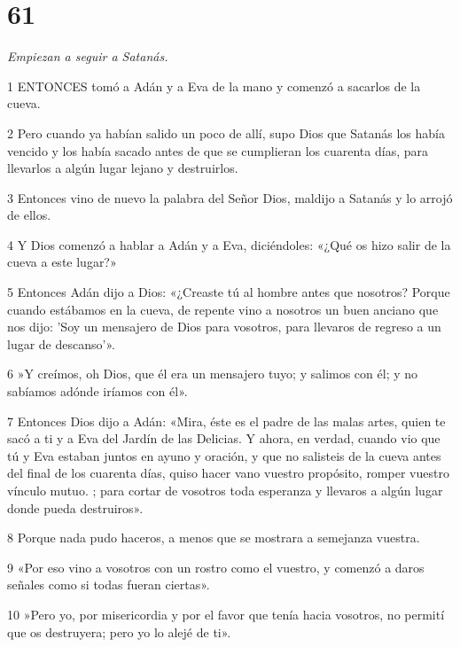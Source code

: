 \chapter{61}

\par \textit{Empiezan a seguir a Satanás.}

\par 1 ENTONCES tomó a Adán y a Eva de la mano y comenzó a sacarlos de la cueva.

\par 2 Pero cuando ya habían salido un poco de allí, supo Dios que Satanás los había vencido y los había sacado antes de que se cumplieran los cuarenta días, para llevarlos a algún lugar lejano y destruirlos.

\par 3 Entonces vino de nuevo la palabra del Señor Dios, maldijo a Satanás y lo arrojó de ellos.

\par 4 Y Dios comenzó a hablar a Adán y a Eva, diciéndoles: «¿Qué os hizo salir de la cueva a este lugar?»

\par 5 Entonces Adán dijo a Dios: «¿Creaste tú al hombre antes que nosotros? Porque cuando estábamos en la cueva, de repente vino a nosotros un buen anciano que nos dijo: 'Soy un mensajero de Dios para vosotros, para llevaros de regreso a un lugar de descanso'».

\par 6 »Y creímos, oh Dios, que él era un mensajero tuyo; y salimos con él; y no sabíamos adónde iríamos con él».

\par 7 Entonces Dios dijo a Adán: «Mira, éste es el padre de las malas artes, quien te sacó a ti y a Eva del Jardín de las Delicias. Y ahora, en verdad, cuando vio que tú y Eva estaban juntos en ayuno y oración, y que no salisteis de la cueva antes del final de los cuarenta días, quiso hacer vano vuestro propósito, romper vuestro vínculo mutuo. ; para cortar de vosotros toda esperanza y llevaros a algún lugar donde pueda destruiros».

\par 8 Porque nada pudo haceros, a menos que se mostrara a semejanza vuestra.

\par 9 «Por eso vino a vosotros con un rostro como el vuestro, y comenzó a daros señales como si todas fueran ciertas».

\par 10 »Pero yo, por misericordia y por el favor que tenía hacia vosotros, no permití que os destruyera; pero yo lo alejé de ti».

